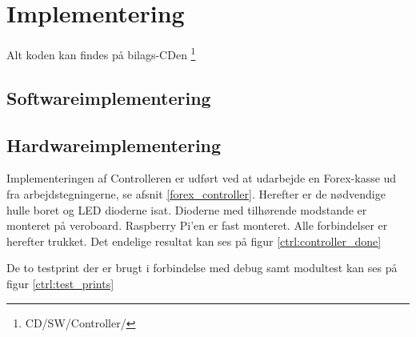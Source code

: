 \section{Implementering}

Alt koden kan findes på bilags-CDen \citep{cd}\footnote{CD/SW/Controller/}

\subsection{Softwareimplementering}


\subsection{Hardwareimplementering}

Implementeringen af Controlleren er udført ved at udarbejde en Forex-kasse ud fra arbejdstegningerne, se afsnit \ref{forex_controller}. Herefter er de nødvendige hulle boret og LED dioderne isat. Dioderne med tilhørende modstande er monteret på veroboard. Raspberry Pi'en er fast monteret. Alle forbindelser er herefter trukket.
Det endelige resultat kan ses på figur \ref{ctrl:controller_done}


De to testprint der er brugt i forbindelse med debug samt modultest kan ses på figur \ref{ctrl:test_prints}

